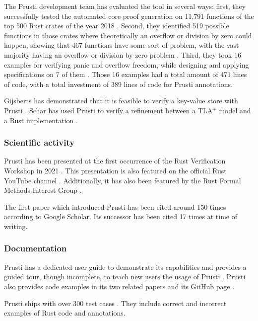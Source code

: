 The Prusti development team has evaluated the tool in several ways: first, they successfully tested the automated core proof generation on 11,791 functions of the top 500 Rust crates of the year 2018 \cite{astrauskas_leveraging_2019}. Second, they identified 519 possible functions in those crates where theoretically an overflow or division by zero could happen, showing that 467 functions have some sort of problem, with the vast majority having an overflow or division by zero problem \cite{astrauskas_leveraging_2019}. Third, they took 16 examples for verifying panic and overflow freedom, while designing and applying specifications on 7 of them \cite{astrauskas_leveraging_2019}. Those 16 examples had a total amount of 471 lines of code, with a total investment of 389 lines of code for Prusti annotations.

Gijsberts has demonstrated that it is feasible to verify a key-value store with Prusti \cite{stef_gijsberts_prusti_2023}. Schar has used Prusti to verify a refinement between a TLA$^+$ model and a Rust implementation \cite{schar_proving_2023}.

\subsubsection{Scientific activity}
Prusti has been presented at the first occurrence of the Rust Verification Workshop in 2021 \cite{peter_muller_rust_2021}. This presentation is also featured on the official Rust YouTube channel \cite{alex_summers_prusti_2021}. Additionally, it has also been featured by the Rust Formal Methods Interest Group \cite{rust_formal_methods_interest_group_tools_2021}.

The first paper \cite{astrauskas_leveraging_2019} which introduced Prusti has been cited around 150 times according to Google Scholar. Its successor \cite{deshmukh_prusti_2022} has been cited 17 times at time of writing.

\subsubsection{Documentation}
Prusti has a dedicated user guide to demonstrate its capabilities and provides a guided tour, though incomplete, to teach new users the usage of Prusti \cite{prusti_user_guide_introduction_2023}. Prusti also provides code examples in its two related papers \cite{deshmukh_prusti_2022, astrauskas_leveraging_2019} and its GitHub page \cite{eth_zurich_viperprojectprusti-dev_2023}.

Prusti ships with over 300 test cases \cite{astrauskas_leveraging_2019}. They include correct and incorrect examples \cite{eth_zurich_prusti-devprusti-tests_2023} of Rust code and annotations.